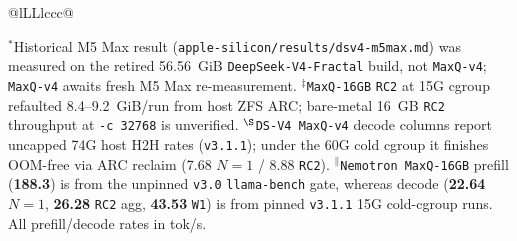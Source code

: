 \documentclass[10pt,twocolumn]{article}
\begin{document}
\begin{table}[t]
\begin{tabularx}{\textwidth}{@{}lLLlccc@{}}
\bottomrule
\end{tabularx}
\vspace{2pt}
\raggedright\scriptsize $^*$Historical M5 Max result (\texttt{apple-silicon/results/dsv4-m5max.md}) was measured on the retired 56.56~GiB \texttt{DeepSeek-V4-Fractal} build, not \texttt{MaxQ-v4}; \texttt{MaxQ-v4} awaits fresh M5 Max re-measurement. $^\ddagger$\texttt{MaxQ-16GB} \texttt{RC2} at 15G cgroup refaulted 8.4--9.2~GiB/run from host ZFS ARC; bare-metal 16~GB \texttt{RC2} throughput at \texttt{-c 32768} is unverified. $^\S$\texttt{DS-V4 MaxQ-v4} decode columns report uncapped 74G host H2H rates (\texttt{v3.1.1}); under the 60G cold cgroup it finishes OOM-free via ARC reclaim (7.68 $N=1$ / 8.88 \texttt{RC2}). $^\parallel$\texttt{Nemotron MaxQ-16GB} prefill (\textbf{188.3}) is from the unpinned \texttt{v3.0} \texttt{llama-bench} gate, whereas decode (\textbf{22.64} $N=1$, \textbf{26.28} \texttt{RC2} agg, \textbf{43.53} \texttt{W1}) is from pinned \texttt{v3.1.1} 15G cold-cgroup runs. All prefill/decode rates in tok/s.
\end{table}
\end{document}
